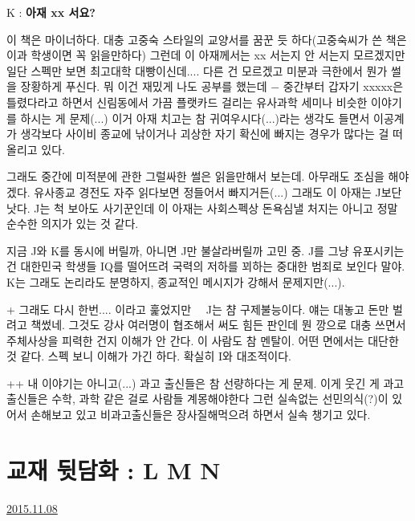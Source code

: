 K : \textbf{아재 xx 서요?}
\vspace{5mm}

이 책은 마이너하다. 대충 고중숙 스타일의 교양서를 꿈꾼 듯 하다(고중숙씨가 쓴 책은 이과 학생이면 꼭 읽을만하다)
그런데 이 아재께서는 xx 서는지 안 서는지 모르겠지만 일단 스펙만 보면 최고대학 대빵이신데....
다른 건 모르겠고 미분과 극한에서 뭔가 썰을 장황하게 푸신다. 뭐 이건 재밌게 나도 공부를 했는데 $-$
중간부터 갑자기 xxxxx은 틀렸다라고 하면서 신림동에서 가끔 플랫카드 걸리는 유사과학 세미나 비슷한 이야기를 하시는 게 문제(...)
이거 아재 치고는 참 귀여우시다(...)라는 생각도 들면서
이공계가 생각보다 사이비 종교에 낚이거나 괴상한 자기 확신에 빠지는 경우가 많다는 걸 떠올리고 있다.
\vspace{5mm}

그래도 중간에 미적분에 관한 그럴싸한 썰은 읽을만해서 보는데. 아무래도 조심을 해야겠다.
유사종교 경전도 자주 읽다보면 정들어서 빠지거든(...)
그래도 이 아재는 J보단 낫다. J는 척 보아도 사기꾼인데 이 아재는 사회스펙상 돈욕심낼 처지는 아니고 정말 순수한 의지가 있는 것 같다.
\vspace{5mm}

지금 J와 K를 동시에 버릴까, 아니면 J만 불살라버릴까 고민 중.
J를 그냥 유포시키는 건 대한민국 학생들 IQ를 떨어뜨려 국력의 저하를 꾀하는 중대한 범죄로 보인다 말야.
K는 그래도 논리라도 분명하지, 종교적인 메시지가 강해서 문제지만(...).
\vspace{5mm}

+
그래도 다시 한번.... 이라고 훑었지만   J는 챰 구제불능이다. 얘는 대놓고 돈만 벌려고 책썼네.
그것도 강사 여러명이 협조해서 써도 힘든 판인데 뭔 깡으로 대충 쓰면서 주체사상을 피력한 건지 이해가 안 간다.
이 사람도 참 멘탈이. 어떤 면에서는 대단한 것 같다.
스펙 보니 이해가 가긴 하다. 확실히 I와 대조적이다.
\vspace{5mm}

++
내 이야기는 아니고(...)
과고 출신들은 참 선량하다는 게 문제.
이게 웃긴 게 과고 출신들은 수학, 과학 같은 걸로 사람들 계몽해야한다 그런 실속없는 선민의식(?)이 있어서 손해보고 있고
비과고출신들은 장사질해먹으려 하면서 실속 챙기고 있다.
\vspace{5mm}












\section{교재 뒷담화 : L M N}
\href{https://www.kockoc.com/Apoc/470245}{2015.11.08}

